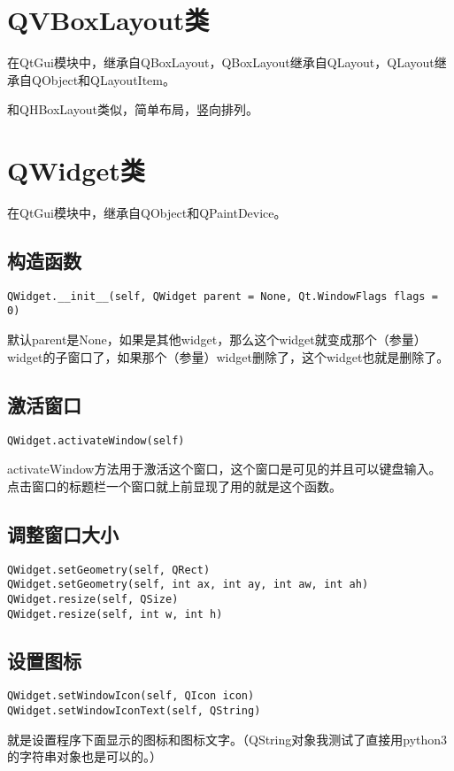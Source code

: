 \documentclass[12pt,oneside]{book}
\begin{document}
\begin{common-format}
\section{QVBoxLayout类}
在QtGui模块中，继承自QBoxLayout，QBoxLayout继承自QLayout，QLayout继承自QObject和QLayoutItem。

和QHBoxLayout类似，简单布局，竖向排列。


\section{QWidget类}
在QtGui模块中，继承自QObject和QPaintDevice。

\subsection{构造函数}
\begin{Verbatim}
QWidget.__init__(self, QWidget parent = None, Qt.WindowFlags flags = 0)
\end{Verbatim}

默认parent是None，如果是其他widget，那么这个widget就变成那个（参量）widget的子窗口了，如果那个（参量）widget删除了，这个widget也就是删除了。

\subsection{激活窗口}
\begin{Verbatim}
QWidget.activateWindow(self)
\end{Verbatim}
activateWindow方法用于激活这个窗口，这个窗口是可见的并且可以键盘输入。点击窗口的标题栏一个窗口就上前显现了用的就是这个函数。

\subsection{调整窗口大小}
\begin{Verbatim}
QWidget.setGeometry(self, QRect)
QWidget.setGeometry(self, int ax, int ay, int aw, int ah)
QWidget.resize(self, QSize)
QWidget.resize(self, int w, int h)
\end{Verbatim}

\subsection{设置图标}
\begin{Verbatim}
QWidget.setWindowIcon(self, QIcon icon)
QWidget.setWindowIconText(self, QString)
\end{Verbatim}
就是设置程序下面显示的图标和图标文字。（QString对象我测试了直接用python3的字符串对象也是可以的。）



\end{common-format}
\end{document}
